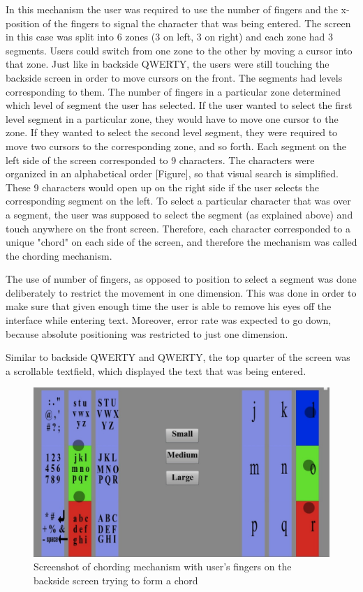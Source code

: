 In this mechanism the user was required to use the number of fingers
and the x-position of the fingers to signal the character that was
being entered. The screen in this case was split into 6 zones (3 on
left, 3 on right) and each zone had 3 segments. Users could switch
from one zone to the other by moving a cursor into that zone. Just
like in backside QWERTY, the users were still touching the backside
screen in order to move cursors on the front. The segments had levels
corresponding to them. The number of fingers in a particular zone
determined which level of segment the user has selected. If the user
wanted to select the first level segment in a particular zone, they
would have to move one cursor to the zone. If they wanted to select
the second level segment, they were required to move two cursors to
the corresponding zone, and so forth. Each segment on the left side of
the screen corresponded to 9 characters. The characters were organized
in an alphabetical order [Figure], so that visual search is
simplified. These 9 characters would open up on the right side if the
user selects the corresponding segment on the left. To select a
particular character that was over a segment, the user was supposed to
select the segment (as explained above) and touch anywhere on the
front screen. Therefore, each character corresponded to a unique
"chord" on each side of the screen, and therefore the mechanism was
called the chording mechanism.

The use of number of fingers, as opposed to position to select a
segment was done deliberately to restrict the movement in one
dimension. This was done in order to make sure that given enough time
the user is able to remove his eyes off the interface while entering
text. Moreover, error rate was expected to go down, because absolute
positioning was restricted to just one dimension.

Similar to backside QWERTY and QWERTY, the top quarter of the screen
was a scrollable textfield, which displayed the text that was being
entered.

\begin{figure}
    \includegraphics[scale=0.45]{Figures/chording.pdf} 
    \caption{Screenshot of chording mechanism with user's fingers on
      the backside screen trying to form a chord}
\end{figure} 
